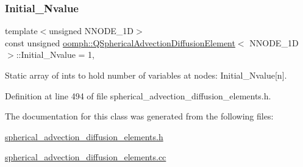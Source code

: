 \subsubsection{\texorpdfstring{Initial\+\_\+\+Nvalue}{Initial\_Nvalue}}
{\footnotesize\ttfamily template$<$unsigned N\+N\+O\+D\+E\+\_\+1D$>$ \\
const unsigned \hyperlink{classoomph_1_1QSphericalAdvectionDiffusionElement}{oomph\+::\+Q\+Spherical\+Advection\+Diffusion\+Element}$<$ N\+N\+O\+D\+E\+\_\+1D $>$\+::Initial\+\_\+\+Nvalue = 1\hspace{0.3cm}{\ttfamily [static]}, {\ttfamily [private]}}



Static array of ints to hold number of variables at nodes\+: Initial\+\_\+\+Nvalue\mbox{[}n\mbox{]}. 



Definition at line 494 of file spherical\+\_\+advection\+\_\+diffusion\+\_\+elements.\+h.



The documentation for this class was generated from the following files\+:\begin{DoxyCompactItemize}
\item 
\hyperlink{spherical__advection__diffusion__elements_8h}{spherical\+\_\+advection\+\_\+diffusion\+\_\+elements.\+h}\item 
\hyperlink{spherical__advection__diffusion__elements_8cc}{spherical\+\_\+advection\+\_\+diffusion\+\_\+elements.\+cc}\end{DoxyCompactItemize}
